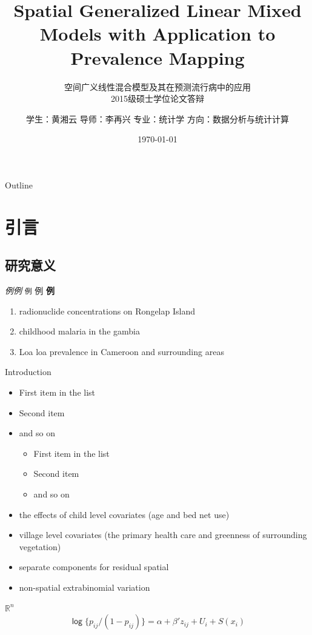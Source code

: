 \documentclass[9pt,compress,xcolor=x11names,UTF8]{beamer}
\title[Spatial Generalized Linear Mixed Models]{Spatial Generalized Linear Mixed Models with Application to Prevalence Mapping}
\subtitle{空间广义线性混合模型及其在预测流行病中的应用\\ 2015级硕士学位论文答辩}
\author[黄湘云]{学生：黄湘云 \newline 导师：李再兴 \newline 专业：统计学 \newline 方向：数据分析与统计计算}
\institute[中国矿业大学（北京）]{理学院\\ 计算数学与统计系}
\date{\today}
\begin{document}
\maketitle
\begin{frame}{Outline}
\tableofcontents
\end{frame}

\section{引言}

\subsection{研究意义}

\begin{frame}{}
\emph{例}\textit{例} \texttt{例} \textsf{例} \textbf{例}
\begin{enumerate}
\item radionuclide concentrations on Rongelap Island
\item childhood malaria in the gambia
\item Loa loa prevalence in Cameroon and surrounding areas
\end{enumerate}

\end{frame}

\begin{frame}{Introduction}
\citet{Diggle2002}
\begin{itemize}
\item First item in the list
\item Second item
\item and so on
\begin{itemize}
\item First item in the list
\item Second item
\item and so on
\end{itemize}
\end{itemize}

\begin{itemize}
\item the effects of child level covariates (age and bed net use)
\item village level covariates (the primary health care and greenness of surrounding vegetation)
\item separate components for residual spatial
\item non-spatial extrabinomial variation
\end{itemize}
$\mathbb{R}^{n}$
$$ \mathsf{\log} \{p_{ij}/(1-p_{ij})\} =\alpha + \beta'z_{ij} + U_{i} + S(x_{i})$$

\end{frame}
\end{document}
